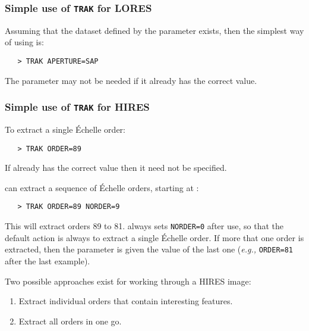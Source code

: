 \subsubsection{Simple use of {\tt TRAK} for LORES}

Assuming that the dataset defined by the 
parameter exists, then the simplest way of using
 is:

\begin{verbatim}
   > TRAK APERTURE=SAP
\end{verbatim}

The  parameter may not be needed if it
already has the correct value.

\subsubsection{Simple use of {\tt TRAK} for HIRES}

To extract a single \'{E}chelle order:

\begin{verbatim}
   > TRAK ORDER=89
\end{verbatim}

If 
 already has the correct value then it need not be specified.

 can extract a sequence of 
 \'{E}chelle orders, starting
at :

\begin{verbatim}
   > TRAK ORDER=89 NORDER=9
\end{verbatim}

This will extract orders 89 to 81.  
 always sets \verb+NORDER=0+
after use, so that the default action is always to extract a single \'{E}chelle
order.  If more that one order is extracted, then the 
 parameter
is given the value of the last one ({\it{e.g.,}} \verb+ORDER=81+ after the last
example)\@.

Two possible approaches exist for working through a HIRES image:

\begin{enumerate}

\item Extract individual orders that contain interesting features.

\item Extract all orders in one go.

\end{enumerate}

